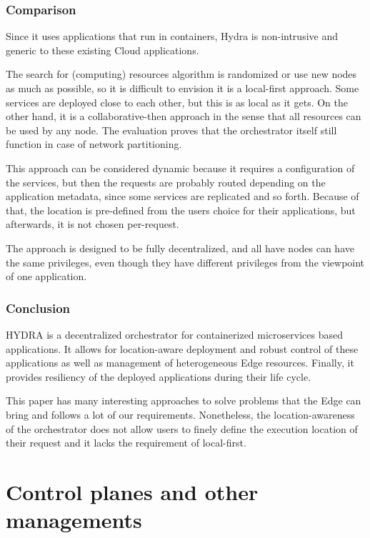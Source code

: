 \subsubsection*{Comparison}

Since it uses applications that run in containers, Hydra is non-intrusive
and generic to these existing Cloud applications.
%

The search for (computing) resources algorithm is randomized or use
new nodes as much as possible, so it is difficult to envision it is a
local-first approach.
%
Some services are deployed close to each other, but this is as local
as it gets.
%
On the other hand, it is a collaborative-then approach in the sense
that all resources can be used by any node.
%
The evaluation proves that the orchestrator itself still function in
case of network partitioning.
%

This approach can be considered dynamic because it requires a
configuration of the services, but then the requests are probably
routed depending on the application metadata, since some services are
replicated and so forth.
%
Because of that, the location is pre-defined from the users choice for
their applications, but afterwards, it is not chosen per-request.

The approach is designed to be fully decentralized, and all have nodes
can have the same privileges, even though they have different
privileges from the viewpoint of one application.


\subsubsection*{Conclusion}

HYDRA is a decentralized orchestrator for containerized microservices
based applications.
%
It allows for location-aware deployment and robust control of these
applications as well as management of heterogeneous Edge resources.
%
Finally, it provides resiliency of the deployed applications during
their life cycle.

This paper has many interesting approaches to solve problems that the
Edge can bring and follows a lot of our requirements.
%
Nonetheless, the location-awareness of the orchestrator does not allow
users to finely define the execution location of their request and it
lacks the requirement of local-first.


\section{Control planes and other managements}
\label{sec:other-management}

